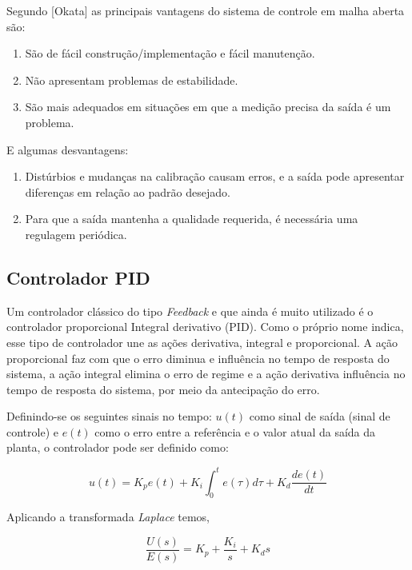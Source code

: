 Segundo [Okata] as principais vantagens do sistema de controle em malha aberta são:
\begin{enumerate}
    \item São de fácil construção/implementação e fácil manutenção.
    \item Não apresentam problemas de estabilidade.
    \item São mais adequados em situações em que a medição precisa da saída é um problema.
\end{enumerate}

E algumas desvantagens:

\begin{enumerate}
    \item Distúrbios e mudanças na calibração causam erros, e a saída pode apresentar diferenças
    em relação ao padrão desejado.
    \item Para que a saída mantenha a qualidade requerida, é necessária uma regulagem periódica.
\end{enumerate}


\subsection{Controlador PID}
Um controlador clássico do tipo \emph{Feedback} e que ainda é muito utilizado é o controlador proporcional Integral derivativo (PID). Como o próprio nome indica, esse tipo de controlador une as ações derivativa, integral e proporcional. A ação proporcional faz com que o erro diminua e influência no tempo de resposta do sistema, a ação integral elimina o erro de regime e a ação derivativa influência no tempo de resposta do sistema, por meio da antecipação do erro.

Definindo-se os seguintes sinais no tempo: $u(t)$ como sinal de saída (sinal de controle) e $e(t)$ como o erro entre a referência e o valor atual da saída da planta, o controlador pode ser definido como:

\begin{equation}
    u(t) = K_{p}e(t) + K_{i} \int^{t}_{0}e(\tau)d\tau + K_{d}\frac{d e(t)}{dt}
\end{equation}

Aplicando a transformada \emph{Laplace} temos,

\begin{equation}
    \frac{U(s)}{E(s)} = K_{p} + \frac{K_{i}}{s} + K_{d}s
\end{equation}

